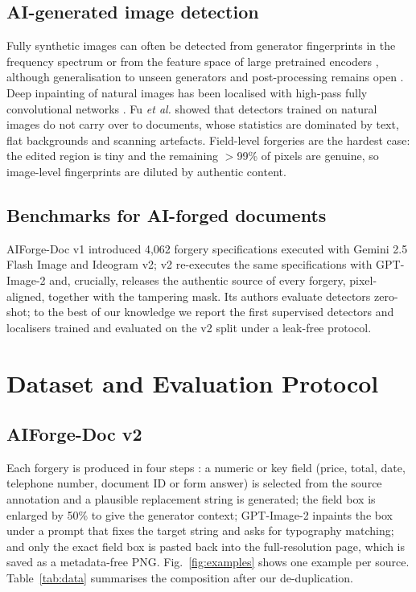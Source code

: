 \documentclass[conference]{IEEEtran}
\begin{document}
\subsection{AI-generated image detection}
Fully synthetic images can often be detected from generator fingerprints in the frequency spectrum \cite{wang2020,corvi} or from the feature space of large pretrained encoders \cite{ojha}, although generalisation to unseen generators and post-processing remains open \cite{li2025}. Deep inpainting of natural images has been localised with high-pass fully convolutional networks \cite{hpfcn}. Fu \emph{et al.} \cite{fu2026} showed that detectors trained on natural images do not carry over to documents, whose statistics are dominated by text, flat backgrounds and scanning artefacts. Field-level forgeries are the hardest case: the edited region is tiny and the remaining $>$99\% of pixels are genuine, so image-level fingerprints are diluted by authentic content.

\subsection{Benchmarks for AI-forged documents}
AIForge-Doc v1 \cite{aiforge1} introduced 4,062 forgery specifications executed with Gemini 2.5 Flash Image and Ideogram v2; v2 \cite{aiforge2} re-executes the same specifications with GPT-Image-2 and, crucially, releases the authentic source of every forgery, pixel-aligned, together with the tampering mask. Its authors evaluate detectors zero-shot; to the best of our knowledge we report the first supervised detectors and localisers trained and evaluated on the v2 split under a leak-free protocol.

\section{Dataset and Evaluation Protocol}\label{sec:data}
\subsection{AIForge-Doc v2}
Each forgery is produced in four steps \cite{aiforge2}: a numeric or key field (price, total, date, telephone number, document ID or form answer) is selected from the source annotation and a plausible replacement string is generated; the field box is enlarged by 50\% to give the generator context; GPT-Image-2 inpaints the box under a prompt that fixes the target string and asks for typography matching; and only the exact field box is pasted back into the full-resolution page, which is saved as a metadata-free PNG. Fig.~\ref{fig:examples} shows one example per source. Table~\ref{tab:data} summarises the composition after our de-duplication.
\end{document}
